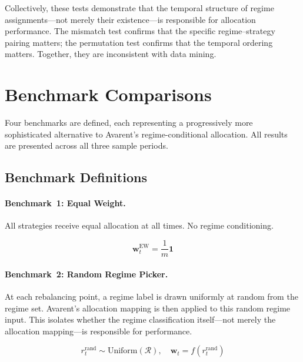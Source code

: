 \documentclass[12pt]{article}
\begin{document}
Collectively, these tests demonstrate that the temporal structure of regime assignments---not merely their existence---is responsible for allocation performance.
The mismatch test confirms that the specific regime--strategy pairing matters; the permutation test confirms that the temporal ordering matters.
Together, they are inconsistent with data mining.

\section{Benchmark Comparisons}
\label{sec:benchmarks}

Four benchmarks are defined, each representing a progressively more sophisticated alternative to Avarent's regime-conditional allocation.
All results are presented across all three sample periods.

\subsection{Benchmark Definitions}

\paragraph{Benchmark~1: Equal Weight.}
All strategies receive equal allocation at all times.
No regime conditioning.

\begin{equation}
    \mathbf{w}_t^{\text{EW}} = \frac{1}{m}\mathbf{1}
\end{equation}

\paragraph{Benchmark~2: Random Regime Picker.}
At each rebalancing point, a regime label is drawn uniformly at random from the regime set.
Avarent's allocation mapping is then applied to this random regime input.
This isolates whether the regime classification itself---not merely the allocation mapping---is responsible for performance.

\begin{equation}
    r_t^{\text{rand}} \sim \text{Uniform}(\mathcal{R}), \quad \mathbf{w}_t = f(r_t^{\text{rand}})
\end{equation}
\end{document}
